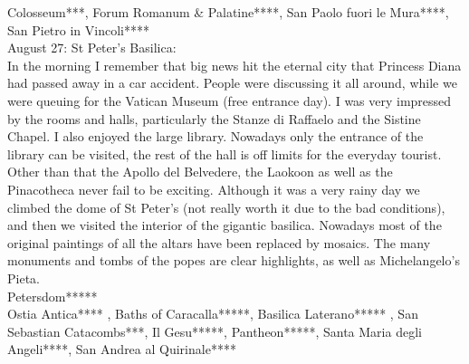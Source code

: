 Colosseum***, Forum Romanum \& Palatine****, San Paolo fuori le Mura****, San Pietro in Vincoli****\\


August 27: St Peter's Basilica:\\
In the morning I remember that big news hit the eternal city that Princess Diana had passed away in a car accident. People were discussing it all around, while we were queuing for the Vatican Museum (free entrance day). I was very impressed by the rooms and halls, particularly the Stanze di Raffaelo and the Sistine Chapel. I also enjoyed the large library. Nowadays only the entrance of the library can be visited, the rest of the hall is off limits for the everyday tourist. Other than that the Apollo del Belvedere, the Laokoon as well as the Pinacotheca never fail to be exciting. Although it was a very rainy day we climbed the dome of St Peter's (not really worth it due to the bad conditions), and then we visited the interior of the gigantic basilica. Nowadays most of the original paintings of all the altars have been replaced by mosaics. The many monuments and tombs of the popes are clear highlights, as well as Michelangelo's Pieta.\\  

Petersdom*****\\





Ostia Antica**** , Baths of Caracalla*****, Basilica Laterano***** , San Sebastian Catacombs***,  Il Gesu*****, Pantheon*****, Santa Maria degli Angeli****, San Andrea al Quirinale****
